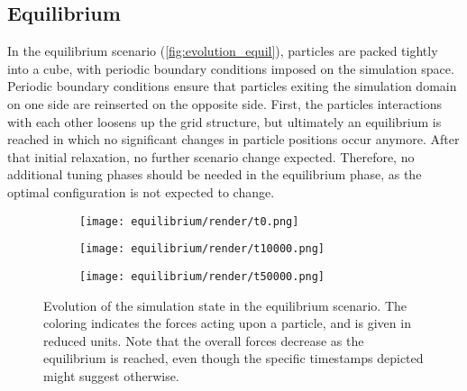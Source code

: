 \newcommand{\fastcolorbarhor}{%
	\centering
	\begin{tikzpicture}
		\node[anchor=east, align=center] at (-0.25cm,-0.25cm) {\si{F^{*}}};
		\pgfplotscolorbardrawstandalone[
			colorbar horizontal,
			colormap name=fast,
			point meta min=0,
			point meta max=50,
			colorbar style={
					width=3cm,
					xtick={0,10,...,50},
					tick align=outside,
					tick pos=top,
					xticklabel pos=top,
				},
		]
	\end{tikzpicture}
}


\subsection{Equilibrium}
\label{subsec:scenario_equil}
In the equilibrium scenario (\autoref{fig:evolution_equil}), particles are packed tightly into a cube, with periodic boundary conditions imposed on the simulation space. Periodic boundary conditions ensure that particles exiting the simulation domain on one side are reinserted on the opposite side. First, the particles interactions with each other loosens up the grid structure, but ultimately an equilibrium is reached in which no significant changes in particle positions occur anymore. After that initial relaxation, no further scenario change expected. Therefore, no additional tuning phases should be needed in the equilibrium phase, as the optimal configuration is not expected to change.

\begin{figure}[htpb]
	\centering
	\begin{subfigure}[c]{.3\textwidth}
		\texttt{[image: equilibrium/render/t0.png]}
	\end{subfigure}%
	\begin{subfigure}[c]{.3\textwidth}
		\texttt{[image: equilibrium/render/t10000.png]}
	\end{subfigure}%
	\begin{subfigure}[c]{.3\textwidth}
		\texttt{[image: equilibrium/render/t50000.png]}
	\end{subfigure}%
	\hfill\begin{subfigure}[c]{.08\textwidth}
		\fastcolorbar
	\end{subfigure}
	\caption{Evolution of the simulation state in the equilibrium scenario. The coloring indicates the forces acting upon a particle, and is given in reduced units. Note that the overall forces decrease as the equilibrium is reached, even though the specific timestamps depicted might suggest otherwise.}
	\label{fig:evolution_equil}
\end{figure}


